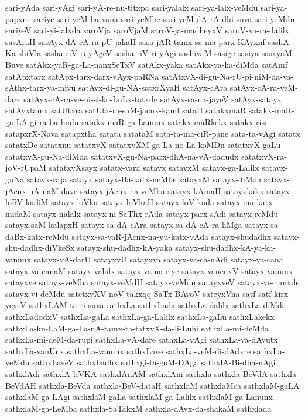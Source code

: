 {sari-yAda
sari-yAgi
sari-yA-re-nu-titxpa
sari-yalalx
sari-ya-lalx-veMdu
sari-ya-papxne
sariye
sari-yeM-ba-vana
sari-yeMbe
sari-yeM-dA-rA-dhi-suva
sari-yeMdu
sariyeV
sari-yi-lalxda
saroVja
saroVjaM
saroV-ja-madheyxV
saroV-va-ra-dalilx
sasAraH
sasAyx-dA-cA-ra-pU-jakaH
sasa-jAR-tamx-sa-ma-parx-KAyxnf
sashA-Ka-shiVla
sasha-riV-ri-yAgeV
sasha-riV-ri-yAgi
sashivaM
sasige
sasiya
sasxyaM-Buve
satAkx-yaR-ga-La-nanxSeTxV
satAkx-yaka
satAkx-ya-ka-diMda
satAmf
satApxtarx
satApx-tarx-darx-vAyx-paRNa
satAtxvX-di-gu-Na-rU-pi-niM-da-va-sAthx-tarx-ya-mivu
satAvx-di-gu-NA-satxrXyaH
satAyx-cAra
satAyx-cA-ra-veM-dare
satAyx-cA-ra-ve-ni-si-ko-LuLx-tatxde
satAyx-sa-na-jayeV
satAyx-satayx
satAyxtamx
satUtxra
satUtx-ra-saM-jacnx-kamf
sataH
satakxmaR
satakx-maR-ga-LA-gi-ra-ba-hudu
satakx-maR-ga-Lanunx
satakx-maRkekx
satakx-risi
satapxrX-Nava
satapxtha
satata
satataM
sata-ta-ma-ciR-pane
sata-ta-vAgi
satatx
satatxDe
satatxnu
satatxvX
satatxvXM-ga-La-no-La-koMDu
satatxvX-gaLu
satatxvX-gu-Na-diMda
satatxvX-gu-Na-parx-dhA-na-vA-dadudx
satatxvX-ra-joV-rUpaM
satatxvXsayx
satatx-vara
satavx
satavxM
satavx-ga-Lalilx
satavx-guNa
satavx-raja
satayx
satayx-Ba-katx-neMbe
satayxM
satayx-diMda
satayx-jAcnx-nA-naM-dave
satayx-jAcnx-na-veMba
satayx-kAmaH
satayxkakx
satayx-loRV-kadiM
satayx-loVka
satayx-loVkaH
satayx-loV-kada
satayx-mu-katx-midaM
satayx-nalalx
satayx-ni-SaThx-rAda
satayx-parx-sAdi
satayx-reMdu
satayx-saM-kalapxH
satayx-sa-dA-cAra
satayx-sa-dA-cA-ra-liMga
satayx-sa-daBx-katx-reMdu
satayx-sa-vaR-jAcnx-na-yu-katx-vAda
satayx-shudadhx
satayx-shu-dadhx-diVkeSx
satayx-shu-dadhx-kA-yaka
satayx-shu-dadhx-kA-ya-ka-vanunx
satayx-vA-darU
satayxvU
satayxva
satayx-va-ca-nAdi
satayx-va-cana
satayx-va-canaM
satayx-valalx
satayx-va-na-riye
satayx-vanenxV
satayx-vanunx
satayxve
satayx-veMba
satayx-veMdU
satayx-veMdu
satayxveV
satayx-ve-nanxde
satayx-vi-deMdu
satetxvXV-noV-takxqq-SaTx-BAvoV
sateyxVna
satf
satf-kirx-yeyeV
sathxLAM-ta-ri-suva
sathxLa
sathxLada
sathxLa-dalilx
sathxLa-diMda
sathxLadodxV
sathxLa-gaLa
sathxLa-ga-Lalilx
sathxLa-gaLu
sathxLakekx
sathxLa-ku-LaM-ga-La-nA-tamx-ta-tatxvX-da-li-Luhi
sathxLa-mi-deMda
sathxLa-mi-deM-da-rupi
sathxLa-vA-dare
sathxLa-vAgi
sathxLa-va-dAyutx
sathxLa-vanUnx
sathxLa-vanunx
sathxLave
sathxLa-veM-di-dAdxre
sathxLa-veMdu
sathxLaveV
sathxbadhx
sathxgi-ta-goM-DAga
sathxlA-Bi-dha-nAgi
sathxlAdi
sathxlA-leVKA
sathxlAnAM
sathxlAni
sathxla
sathxla-BeVdA
sathxla-BeVdAH
sathxla-BeVda
sathxla-BeV-dataH
sathxlaM
sathxlaMca
sathxlaM-gaLA
sathxlaM-ga-LAgi
sathxlaM-gaLa
sathxlaM-ga-Lalilx
sathxlaM-ga-Lanunx
sathxlaM-ga-LeMba
sathxla-SaTakxM
sathxla-dAvx-da-shakaM
sathxlada
}
